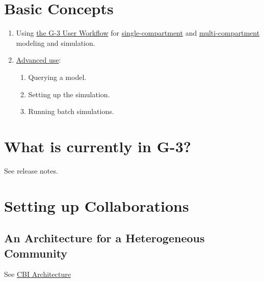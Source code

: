 \documentclass[12pt]{article}
\begin{document}
\section{Basic Concepts}

\begin{enumerate}
\item Using \href{../workflow-user/workflow-user.tex}{the G-3 User
    Workflow} for
  \href{../tutorial1/tutorial1.tex}{single-compartment} and
  \href{../tutorial2/tutorial2.tex}{multi-compartment} modeling and
  simulation.
\item \href{../tutorial3/tutorial3.tex}{Advanced use}:
  \begin{enumerate}
  \item Querying a model.
  \item Setting up the simulation.
  \item Running batch simulations.
  \end{enumerate}
\end{enumerate}

\section{What is currently in G-3?}

See release notes.


\section{Setting up Collaborations}

\subsection{An Architecture for a Heterogeneous Community}

See \href{../genesis-overview/genesis-overview.tex}{CBI Architecture}
\end{document}
